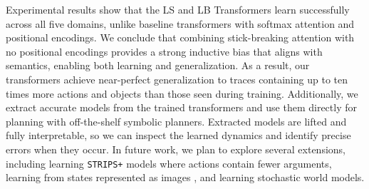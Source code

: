     Experimental results show that the LS and LB Transformers learn successfully across all five domains,
    unlike baseline transformers with softmax attention and positional encodings.
    We conclude that combining stick-breaking attention with no positional encodings provides a strong inductive bias that aligns with \strips semantics, enabling both learning and generalization.
    As a result, our transformers achieve near-perfect generalization to traces containing up to ten times more actions and objects than those seen during training.
    Additionally, we extract accurate \strips models from the trained transformers and use them directly for planning with off-the-shelf symbolic planners.
    Extracted models are lifted and fully interpretable, so we can inspect the learned dynamics and identify precise errors when they occur.
    In future work, we plan to explore several extensions, including learning \texttt{STRIPS+} models \citep{jansen2025incomplete} where actions contain fewer arguments, learning from states represented as images \citep{xi2024neuro,xi2026unsupervised}, and learning stochastic world models.
\fi
